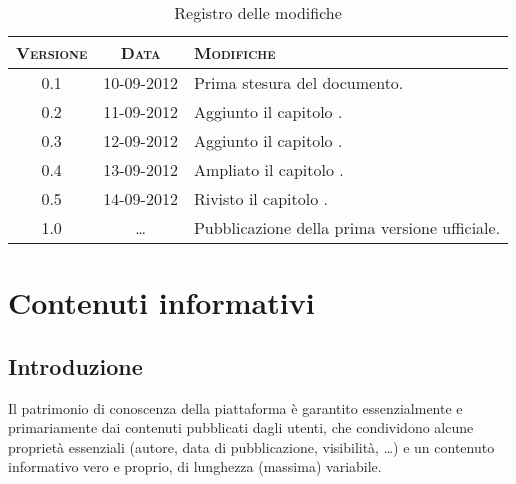\documentclass[10pt,a4paper,headinclude,footinclude,hidelinks]{scrreprt} %
\begin{document}
    \title{\rmfamily\normalfont{}}
    \author{}
    \date{\today}
    
    \maketitle
    
    \begin{abstract}
        \noindent Il documento presenta i risultati delle fasi di analisi e di progettazione dei nuovi criteri di classificazione.
    \end{abstract}
    
	\begin{table}[ht]
	\centering
	\begin{tabular}{|c|c|l|}
	\hline
	\textsc{Versione} & \textsc{Data} & \textsc{Modifiche} \\ \hline
	0.1 & 10-09-2012 & Prima stesura del documento. \\ \hline
	0.2 & 11-09-2012 & Aggiunto il capitolo \nameref{ch:stage:contenuti}. \\ \hline
	0.3 & 12-09-2012 & Aggiunto il capitolo \nameref{ch:stage:req}. \\ \hline
	0.4 & 13-09-2012 & Ampliato il capitolo \nameref{ch:stage:req}. \\ \hline
	0.5 & 14-09-2012 & Rivisto il capitolo \nameref{ch:stage:req}. \\ \hline
	1.0 & \ldots & Pubblicazione della prima versione ufficiale. \\ \hline
	\end{tabular}
	\caption{Registro delle modifiche}
	\label{tab:stage:wp:workload}
	\end{table}

	\tableofcontents
	\listoffigures
	\begingroup
	\let\clearpage\relax
	\listoftables
	\endgroup

	\chapter{Contenuti informativi}
	\label{ch:stage:contenuti}
	\section{Introduzione}
	Il patrimonio di conoscenza della piattaforma è garantito essenzialmente e primariamente dai contenuti pubblicati dagli utenti, che condividono alcune proprietà essenziali (autore, data di pubblicazione, visibilità, \ldots) e un contenuto informativo vero e proprio, di lunghezza (massima) variabile.
\end{document}
